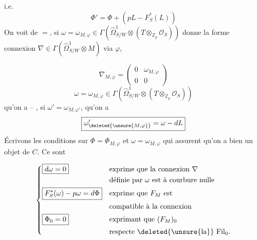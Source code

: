 i.e.
\[
\boxed{\Phi'=\Phi+(pL-F_S^*(L))}
\]
On voit de $=$, si $\omega=\omega_{M,\varphi}\in\Gamma(\widehat\Omega^1_{S/W}\otimes(T\otimes_{\mathbb Z_p}\mathcal O_S))$ donne la forme connexion $\nabla\in\Gamma(\widehat\Omega^1_{S/W}\otimes M)$ via $\varphi$,

\[
\nabla_{M,\varphi}=\begin{pmatrix}0&\omega_{M,\varphi}\\0&0\end{pmatrix}
\]
\[
\boxed{\omega=\omega_{M,\varphi}\in\Gamma(\widehat\Omega^1_{S/W}\otimes(T\otimes_{\mathbb Z_p}\mathcal O_S))}
\]
qu'on a -- , si $\omega'=\omega_{M,\varphi'}$, qu'on a
\[
\boxed{\omega'_{\deleted{\unsure{M,\varphi}}}=\omega-dL}
\]
Écrivons les conditions  sur  $\Phi=\Phi_{M,\varphi}$ et $\omega=\omega_{M,\varphi}$ qui assurent qu'on a bien un objet de $C$. Ce sont

\[
\left\{\begin{aligned}
&\boxed{d\omega=0} &&\text{exprime que la connexion $\nabla$}\\
&&&\text{définie par $\omega$ est à courbure nulle}\\
&\boxed{F_S^*(\omega)-p\omega=d\Phi} &&\text{exprime que $F_M$ est}\\
&&&\text{compatible à la connexion}\\
&\boxed{\Phi_0=0} &&\text{exprimant que $(F_M)_0$}\\
&&&\text{respecte \deleted{\unsure{la}} $\mathrm{Fil}_0$.}
\end{aligned}\right.
\]
